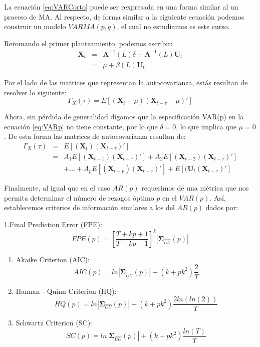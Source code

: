 \documentclass[
]{book}
\begin{document}
La ecuación \eqref{eq:VARCorto} puede ser rexpresada en una forma similar al un proceso de MA. Al respecto, de forma similar a la siguiente ecuación podemos construir un modelo \(VARMA(p,q)\), el cual no estudiamos es este curso.

Reromando el primer planteamiento, podemos escribir:
\begin{eqnarray}
    \mathbf{X}_t & = & \mathbf{A}^{-1}(L) \delta + \mathbf{A}^{-1}(L) \mathbf{U}_t \nonumber \\
    & = & \mu + \beta(L) \mathbf{U}_t
    \label{eq:VARMAq}
\end{eqnarray}

Por el lado de las matrices que representan la autocovarianza, estás resultan de resolver lo siguiente:
\begin{equation}
    \Gamma_X(\tau) = E[(\mathbf{X}_t - \mu)(\mathbf{X}_{t-\tau} - \mu)'] 
\end{equation}

Ahora, sin pérdida de generalidad digamos que la especificación VAR(p) en la ecuación \eqref{eq:VARp} no tiene constante, por lo que \(\delta = 0\), lo que implica que \(\mu = 0\). De esta forma las matrices de autocovarianza resultan de:
\begin{eqnarray*}
    \Gamma_X(\tau) & = & E[(\mathbf{X}_t)(\mathbf{X}_{t-\tau})'] \\
    & = & A_1 E[(\mathbf{X}_{t-1})(\mathbf{X}_{t-\tau})'] + A_2 E[(\mathbf{X}_{t-2})(\mathbf{X}_{t-\tau})'] \\
    &   & + \ldots + A_p E[(\mathbf{X}_{t-p})(\mathbf{X}_{t-\tau})'] + E[(\mathbf{U}_t(\mathbf{X}_{t-\tau})']
\end{eqnarray*}

Finalmente, al igual que en el caso \(AR(p)\) requerimos de una métrica que nos permita determinar el número de rezagos óptimo \(p\) en el \(VAR(p)\). Así, establecemos criterios de información similares a los del \(AR(p)\) dados por:

1.Final Prediction Error (FPE):
\begin{equation}
        FPE(p) = \left[ \frac{T + kp + 1}{T - kp - 1} \right]^k |\mathbf{\Sigma}_{\hat{U}\hat{U}}(p)|
        \end{equation}

\begin{enumerate}
\def\labelenumi{\arabic{enumi}.}
\setcounter{enumi}{1}
\item
  Akaike Criterion (AIC):
  \begin{equation}
       AIC(p) = ln|\mathbf{\Sigma}_{\hat{U}\hat{U}}(p)| + (k + p k^2) \frac{2}{T}
       \end{equation}
\item
  Hannan - Quinn Criterion (HQ):
  \begin{equation}
       HQ(p) = ln|\mathbf{\Sigma}_{\hat{U}\hat{U}}(p)| + (k + p k^2) \frac{2ln(ln(2))}{T}
       \end{equation}
\item
  Schwartz Criterion (SC):
  \begin{equation}
       SC(p) = ln|\mathbf{\Sigma}_{\hat{U}\hat{U}}(p)| + (k + p k^2) \frac{ln(T)}{T}
       \end{equation}
\end{enumerate}
\end{document}
